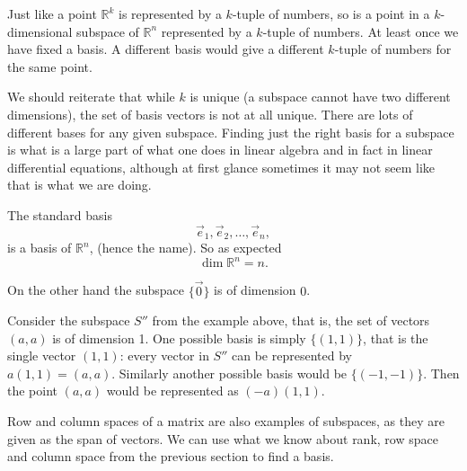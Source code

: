 Just like a point ${\mathbb R}^k$ is represented by a $k$-tuple of
numbers, so is a point in a $k$-dimensional subspace of ${\mathbb R}^n$
represented by a $k$-tuple of numbers.  At least once we have fixed a basis.
A different basis would give a different $k$-tuple of numbers for the same
point.

We should reiterate that while $k$ is unique (a subspace cannot have two different
dimensions), the set of basis vectors is not at all unique.  There are lots
of different bases for any given subspace.  Finding just the right basis for
a subspace is what is a large part of what one does in linear algebra and in
fact in linear differential equations, although at first glance
sometimes it may not seem like that is what we are doing.

\begin{example}
The standard basis
\begin{equation*}
\vec{e}_1, \vec{e}_2, \ldots, \vec{e}_n ,
\end{equation*}
is a basis of ${\mathbb R}^n$, (hence the name).
So as expected
\begin{equation*}
\dim {\mathbb R}^n = n .
\end{equation*}

On the other hand the subspace $\{ \vec{0} \}$ is of dimension $0$.

Consider the subspace $S''$ from the example above, that is, the set of
vectors $(a,a)$ is of dimension 1.  One possible basis is simply
$\{ (1,1) \}$, that is the single
vector $(1,1)$: every vector in $S''$ can be represented by $a (1,1) =
(a,a)$.  Similarly another possible basis would be $\{ (-1,-1) \}$.  Then
the point $(a,a)$ would be represented as $(-a) (1,1)$.
\end{example}

Row and column spaces of a matrix are also examples of
subspaces,
as they are given as the span of vectors.
We can use
what we know about rank, row space and column space
from the previous section to find a basis.


